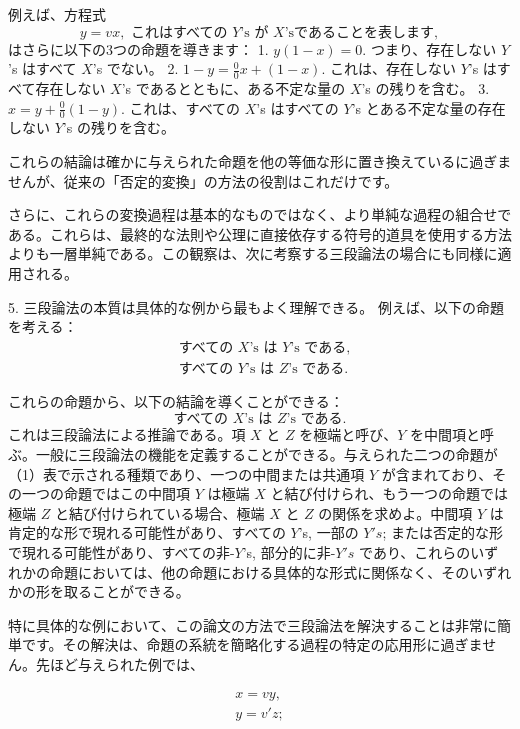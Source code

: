 \documentclass[a4paper,11pt,openany]{ltjsbook}
\begin{document}
例えば、方程式
\[
y = vx, \text{ これはすべての } Y \text{'s が } X \text{'sであることを表します},
\]
はさらに以下の3つの命題を導きます：
1. $y(1-x) = 0.$ つまり、存在しない $Y$'s はすべて $X$'s でない。
2. $\displaystyle 1 - y = \frac{0}{0}x + (1 - x).$ これは、存在しない $Y$'s はすべて存在しない $X$'s であるとともに、ある不定な量の $X$'s の残りを含む。
3. $\displaystyle x = y + \frac{0}{0}(1 - y).$ これは、すべての $X$'s はすべての $Y$'s とある不定な量の存在しない $Y$'s の残りを含む。

これらの結論は確かに与えられた命題を他の等価な形に置き換えているに過ぎませんが、従来の「否定的変換」の方法の役割はこれだけです。

さらに、これらの変換過程は基本的なものではなく、より単純な過程の組合せである。これらは、最終的な法則や公理に直接依存する符号的道具を使用する方法よりも一層単純である。この観察は、次に考察する三段論法の場合にも同様に適用される。

5. 三段論法の本質は具体的な例から最もよく理解できる。
例えば、以下の命題を考える：
\begin{align*}
  &\text{すべての }X\text{'s は }Y\text{'s である},\\
  &\text{すべての }Y\text{'s は }Z\text{'s である}.
\end{align*}

これらの命題から、以下の結論を導くことができる：
\begin{equation*}
\text{すべての }X\text{'s は }Z\text{'s である}.
\end{equation*}
これは三段論法による推論である。項 $X$ と $Z$ を極端と呼び、$Y$ を中間項と呼ぶ。一般に三段論法の機能を定義することができる。与えられた二つの命題が（1）表で示される種類であり、一つの中間または共通項 $Y$ が含まれており、その一つの命題ではこの中間項 $Y$ は極端 $X$ と結び付けられ、もう一つの命題では極端 $Z$ と結び付けられている場合、極端 $X$ と $Z$ の関係を求めよ。中間項 $Y$ は肯定的な形で現れる可能性があり、すべての $Y$'s, 一部の $Y's$; または否定的な形で現れる可能性があり、すべての非-$Y$'s, 部分的に非-$Y's$ であり、これらのいずれかの命題においては、他の命題における具体的な形式に関係なく、そのいずれかの形を取ることができる。

特に具体的な例において、この論文の方法で三段論法を解決することは非常に簡単です。その解決は、命題の系統を簡略化する過程の特定の応用形に過ぎません。先ほど与えられた例では、

\begin{gather*}
x = vy,\\
y = v'z;
\end{gather*}
\end{document}
